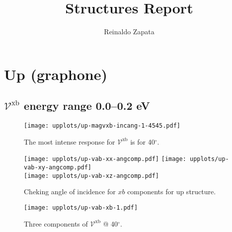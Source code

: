 \documentclass{article}
\title{Structures Report}
\author{Reinaldo Zapata}
\date{}
\let\Oldsection\section
\renewcommand{\section}{\FloatBarrier\Oldsection}
\let\Oldsubsection\subsection
\renewcommand{\subsection}{\FloatBarrier\Oldsubsection}
\begin{document}
\maketitle


\section{Up (graphone)} %
\label{sec:up}



\subsection{$\mathcal{V}^{\mathrm{xb}}$ energy range 0.0--0.2 eV }
\begin{figure}[h]
    \centering
    \texttt{[image: upplots/up-magvxb-incang-1-4545.pdf]}
    \caption{The most intense response for $\mathcal{V}^{\mathrm{xb}} $ is for 
    40$^{\circ}$.}
    \label{fig:up-magvxbincang1}
\end{figure}
\begin{figure}[h]
    \centering
    \texttt{[image: upplots/up-vab-xx-angcomp.pdf]}
    \texttt{[image: upplots/up-vab-xy-angcomp.pdf]}\\
    \texttt{[image: upplots/up-vab-xz-angcomp.pdf]}
    \caption{Cheking angle of incidence for $xb$ components for up structure.}
    \label{fig:up-xbangcomp}
\end{figure}
\begin{figure}[tb]
    \centering
    \texttt{[image: upplots/up-vab-xb-1.pdf]}
    \caption{Three components of $\mathcal{V}^{\mathrm{xb}} $ @ 40$^{\circ}$.}
    \label{fig:up-vxb1}
\end{figure}
\end{document}
